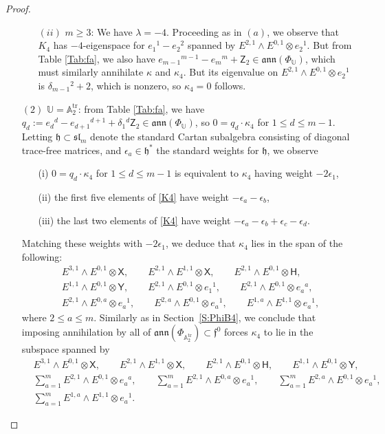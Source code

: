 \documentclass[pdftex]{sigma}%
\newcommand\tensor{\otimes}
\DeclareMathOperator{\tr}{tr}
\newcommand{\fh}{\mathfrak{h}}
\newcommand\fann{\mathfrak{ann}}
\newcommand\ff{\mathfrak{f}}
\newcommand\fsl{\mathfrak{sl}}
\newcommand\bbU{\mathbb{U}}
\newcommand\bbA{\mathbb{A}}
\newcommand\sfX{\mathsf{X}}
\newcommand\sfH{\mathsf{H}}
\newcommand\sfY{\mathsf{Y}}
\newcommand\sfZ{\mathsf{Z}}
\numberwithin{equation}{section}
\begin{document}
\begin{proof}
\begin{itemize}
\begin{itemize}
\item[$(ii)$] $m\geq 3$: We have $\lambda = -4$. Proceeding as in $(a)$, we observe that $K_4$ has $-4$-eigenspace for $e_1{}^1 - e_2{}^2$ spanned by $E^{2,1} \wedge E^{0,1} \tensor e_2{}^1$. But from Table {\rm \ref{Tab:fa}}, we also have $e_{m-1}{}^{m-1} -e_m{}^m + \sfZ_2 \in \fann(\Phi_\bbU)$, which must similarly annihilate $\kappa$ and $\kappa_4$. But its eigenvalue on $E^{2,1} \wedge E^{0,1} \tensor e_2{}^1$ is $\delta_{m-1}{}^2 +2$, which is nonzero, so $\kappa_4 = 0$ follows.
\end{itemize}

\item [$(2)$] $\bbU = \bbA_2^{\tr}$: from Table \ref{Tab:fa}, we have $q_d := e_d{}^d - e_{d+1}{}^{d+1} + \delta_1{}^d \sfZ_2 \in \fann(\Phi_{\bbU})$, so $0 = q_d \cdot \kappa_4$ for $1 \leq d \leq m-1$. Letting $\fh \subset \fsl_m$ denote the standard Cartan subalgebra consisting of diagonal trace-free matrices, and $\epsilon_a \in \fh^*$ the standard weights for $\fh$, we observe
 \begin{itemize}\itemsep=0pt
 \item[(i)] $0 = q_d \cdot \kappa_4$ for $1 \leq d \leq m-1$ is equivalent to $\kappa_4$ having weight $-2\epsilon_1$,
 \item[(ii)] the first five elements of \eqref{K4} have weight $-\epsilon_a - \epsilon_b$,
 \item[(iii)] the last two elements of \eqref{K4} have weight $-\epsilon_a - \epsilon_b + \epsilon_c - \epsilon_d$.
 \end{itemize}
 Matching these weights with $-2\epsilon_1$, we deduce that $\kappa_4$ lies in the span of the following:
\begin{align*}%
&E^{3,1} \wedge E^{0,1} \tensor \sfX, \qquad E^{2,1} \wedge E^{1,1} \tensor \sfX, \qquad E^{2,1} \wedge E^{0,1} \tensor \sfH,\\
&E^{1,1}\wedge E^{0,1} \tensor \sfY, \qquad E^{2,1} \wedge E^{0,1} \tensor e_1{}^1, \qquad E^{2,1} \wedge E^{0,1} \tensor e_a{}^a, \\
&E^{2,1} \wedge E^{0,a} \tensor e_a{}^1, \qquad E^{2,a} \wedge E^{0,1} \tensor e_a{}^1, \qquad E^{1,a} \wedge E^{1,1} \tensor e_a{}^1,
\end{align*}
where $2 \leq a \leq m$. Similarly as in Section~\ref{S:PhiB4}, we conclude that imposing annihilation by all of $\fann(\Phi_{\bbA_2^{\tr}}) \subset \ff^0$ forces $\kappa_4$ to lie in the subspace spanned by
\begin{align}
&E^{3,1} \wedge E^{0,1} \tensor \sfX, \qquad E^{2,1} \wedge E^{1,1} \tensor \sfX, \qquad E^{2,1} \wedge E^{0,1} \tensor \sfH, \qquad E^{1,1} \wedge E^{0,1} \tensor \sfY, \nonumber\\
& \sum_{a=1}^m E^{2,1} \wedge E^{0,1} \tensor e_a{}^a, \qquad \sum_{a=1}^m E^{2,1} \wedge E^{0,a} \tensor e_a{}^1, \qquad \sum_{a=1}^m E^{2,a} \wedge E^{0,1} \tensor e_a{}^1, \nonumber\\
& \sum_{a=1}^m E^{1,a} \wedge E^{1,1} \tensor e_a{}^1.\label{E:offdiag}
\end{align}


\end{itemize}
\end{proof}
\end{document}
